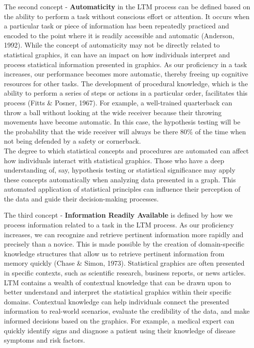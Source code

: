 \documentclass[print]{nuthesis}
\begin{document}
The second concept - \textbf{Automaticity} in the LTM process can be defined based on the ability to perform a task without conscious effort or attention.
It occurs when a particular task or piece of information has been repeatedly practiced and encoded to the point where it is readily accessible and automatic (Anderson, 1992).
While the concept of automaticity may not be directly related to statistical graphics, it can have an impact on how individuals interpret and process statistical information presented in graphics.
As our proficiency in a task increases, our performance becomes more automatic, thereby freeing up cognitive resources for other tasks.
The development of procedural knowledge, which is the ability to perform a series of steps or actions in a particular order, facilitates this process (Fitts \& Posner, 1967).
For example, a well-trained quarterback can throw a ball without looking at the wide receiver because their throwing movements have become automatic.
In this case, the hypothesis testing will be the probability that the wide receiver will always be there 80\% of the time when not being defended by a safety or cornerback.\\
The degree to which statistical concepts and procedures are automated can affect how individuals interact with statistical graphics.
Those who have a deep understanding of, say, hypothesis testing or statistical significance may apply these concepts automatically when analyzing data presented in a graph.
This automated application of statistical principles can influence their perception of the data and guide their decision-making processes.

The third concept - \textbf{Information Readily Available} is defined by how we process information related to a task in the LTM process.
As our proficiency increases, we can recognize and retrieve pertinent information more rapidly and precisely than a novice.
This is made possible by the creation of domain-specific knowledge structures that allow us to retrieve pertinent information from memory quickly (Chase \& Simon, 1973).
Statistical graphics are often presented in specific contexts, such as scientific research, business reports, or news articles.
LTM contains a wealth of contextual knowledge that can be drawn upon to better understand and interpret the statistical graphics within their specific domains.
Contextual knowledge can help individuals connect the presented information to real-world scenarios, evaluate the credibility of the data, and make informed decisions based on the graphics.
For example, a medical expert can quickly identify signs and diagnose a patient using their knowledge of disease symptoms and risk factors.
\end{document}

